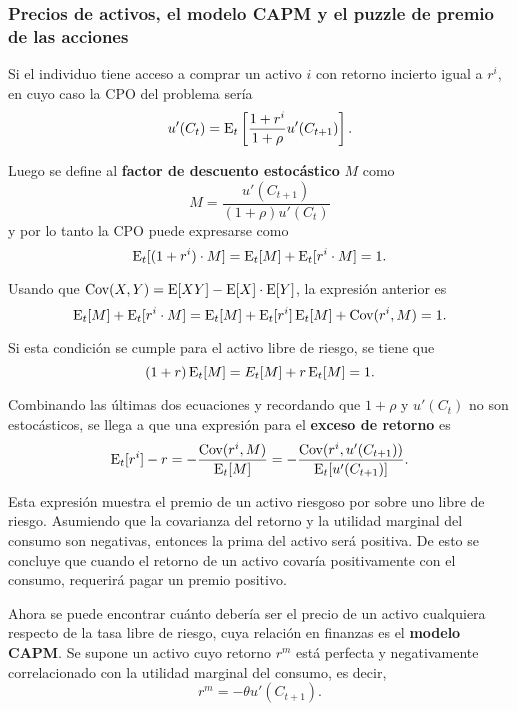 \documentclass[DeGregorioResumen]{subfiles}
\begin{document}
\subsubsection{Precios de activos, el modelo CAPM y el puzzle de premio de las acciones}

Si el individuo tiene acceso a comprar un activo $i$ con retorno incierto igual a $r^i$, en cuyo caso la CPO del problema sería
\begin{equation*}
u'(C_t)= \operatorname{E}_t \left[\frac{1+r^i}{1+\rho} u'(C_{t+1}) \right].
\end{equation*}

Luego se define al \textbf{factor de descuento estocástico} $M$ como
\begin{equation}
M= \frac{u'(C_{t+1})}{(1+\rho)u'(C_t)}
\end{equation}
y por lo tanto la CPO puede expresarse como
\begin{equation*}
\operatorname{E}_t[(1+r^i)\cdot M] = \operatorname{E}_t[M] + \operatorname{E}_t[r^i\cdot M]=1.
\end{equation*}

Usando que $\text{Cov}(X,Y)=\operatorname{E}[XY]-\operatorname{E}[X]\cdot \operatorname{E}[Y] $, la expresión anterior es
\begin{equation*}
\operatorname{E}_t[M]+\operatorname{E}_t[r^i\cdot M] = \operatorname{E}_t[M] + \operatorname{E}_t[r^i]\operatorname{E}_t[M]+ \text{Cov}(r^i, M) = 1.
\end{equation*}

Si esta condición se cumple para el activo libre de riesgo, se tiene que
\begin{equation*}
(1+r)\operatorname{E}_t[M] = E_t[M]+r\operatorname{E}_t[M]=1.
\end{equation*}

Combinando las últimas dos ecuaciones y recordando que $1+\rho$ y $u'(C_t)$ no son estocásticos, se llega a que una expresión para el \textbf{exceso de retorno} es
\begin{equation}
\operatorname{E}_t[r^i]-r = -\frac{\text{Cov}(r^i,M)}{\operatorname{E}_t[M]} = -\frac{\text{Cov}(r^i,u'(C_{t+1}))}{\operatorname{E}_t[u'(C_{t+1})]}.
\label{eq:exceso_retorno}
\end{equation}

Esta expresión muestra el premio de un activo riesgoso por sobre uno libre de riesgo. Asumiendo que la covarianza del retorno y la utilidad marginal del consumo son negativas, entonces la prima del activo será positiva. De esto se concluye que cuando el retorno de un activo covaría positivamente con el consumo, requerirá pagar un premio positivo.

Ahora se puede encontrar cuánto debería ser el precio de un activo cualquiera respecto de la tasa libre de riesgo, cuya relación en finanzas es el \textbf{modelo CAPM}. Se supone un activo cuyo retorno $r^m$ está perfecta y negativamente correlacionado con la utilidad marginal del consumo, es decir,
\[
r^m = -\theta u' (C_{t+1}).
\]
\end{document}
